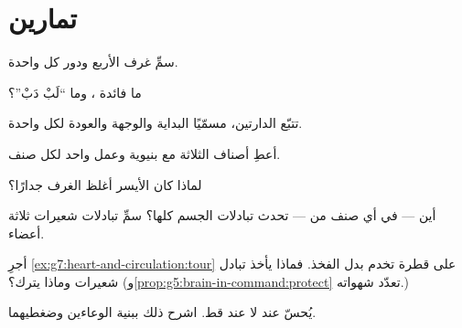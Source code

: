 \section{تمارين}

\begin{exercise}[$\star$]\label{exo:g7:heart-and-circulation:1}
سمِّ غرف  الأربع ودور كل واحدة.
\end{exercise}

\begin{exercise}[$\star$]\label{exo:g7:heart-and-circulation:2}
ما فائدة  ، وما ``لَبْ دَبْ''؟
\end{exercise}

\begin{exercise}[$\star$]\label{exo:g7:heart-and-circulation:3}
تتبّع الدارتين، مسمّيًا البداية والوجهة والعودة لكل واحدة.
\end{exercise}

\begin{exercise}[$\star$]\label{exo:g7:heart-and-circulation:4}
أعطِ أصناف  الثلاثة مع  بنيوية وعمل واحد لكل صنف.
\end{exercise}

\begin{exercise}[$\star$]\label{exo:g7:heart-and-circulation:5}
لماذا كان  الأيسر أغلظ الغرف جدارًا؟
\end{exercise}

\begin{exercise}[$\star$]\label{exo:g7:heart-and-circulation:6}
أين --- في أي صنف من  --- تحدث تبادلات الجسم كلها؟ سمِّ
تبادلات شعيرات ثلاثة أعضاء.
\end{exercise}

\begin{exercise}[$\star\star$]\label{exo:g7:heart-and-circulation:7}
أجرِ \cref{ex:g7:heart-and-circulation:tour} على قطرة تخدم 
بدل الفخذ. فماذا يأخذ تبادل شعيرات  وماذا يترك؟
(و\cref{prop:g5:brain-in-command:protect} تعدّد شهواته.)
\end{exercise}

\begin{exercise}[$\star\star$]\label{exo:g7:heart-and-circulation:8}
 يُحسّ عند  لا عند  قط. اشرح ذلك ببنية
الوعاءين وضغطيهما.
\end{exercise}

